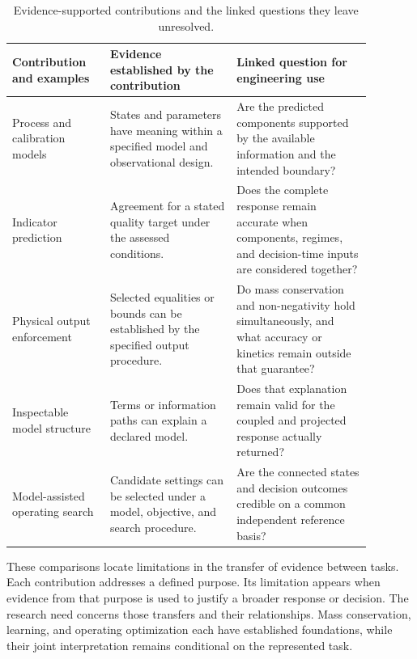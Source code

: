 \begin{table}[htbp]
\centering\footnotesize
\caption{Evidence-supported contributions and the linked questions they leave unresolved.}
\label{tab:rrl_evidence_gap_matrix}
\begin{tabular}{>{\raggedright\arraybackslash}p{0.24\linewidth}>{\raggedright\arraybackslash}p{0.31\linewidth}>{\raggedright\arraybackslash}p{0.33\linewidth}}
\toprule Contribution and examples & Evidence established by the contribution & Linked question for engineering use\\\midrule
Process and calibration models\newline\citep{Hauduc2013,Machado2014} & States and parameters have meaning within a specified model and observational design. & Are the predicted components supported by the available information and the intended boundary?\\
Indicator prediction\newline\citep{Ching2022,Wang2025} & Agreement for a stated quality target under the assessed conditions. & Does the complete response remain accurate when components, regimes, and decision-time inputs are considered together?\\
Physical output enforcement\newline\citep{Beucler2021,KircherVotsmeier2025} & Selected equalities or bounds can be established by the specified output procedure. & Do mass conservation and non-negativity hold simultaneously, and what accuracy or kinetics remain outside that guarantee?\\
Inspectable model structure\newline\citep{Rudin2019,Shen2023} & Terms or information paths can explain a declared model. & Does that explanation remain valid for the coupled and projected response actually returned?\\
Model-assisted operating search\newline\citep{Durkin2024,Pedrozo2025} & Candidate settings can be selected under a model, objective, and search procedure. & Are the connected states and decision outcomes credible on a common independent reference basis?\\
\bottomrule
\end{tabular}
\end{table}

These comparisons locate limitations in the transfer of evidence between tasks. Each contribution addresses a defined purpose. Its limitation appears when evidence from that purpose is used to justify a broader response or decision. The research need concerns those transfers and their relationships. Mass conservation, learning, and operating optimization each have established foundations, while their joint interpretation remains conditional on the represented task.

